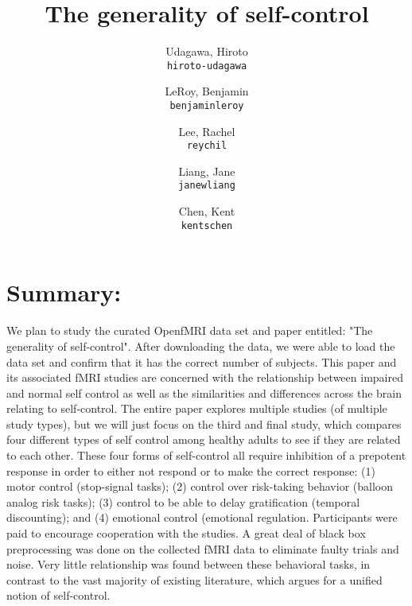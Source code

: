 \documentclass[11pt]{article}
\title{The generality of self-control}
\author{
  Udagawa, Hiroto\\
  \texttt{hiroto-udagawa}
  \and
  LeRoy, Benjamin\\
  \texttt{benjaminleroy}
  \and
  Lee, Rachel\\
  \texttt{reychil}
  \and
  Liang, Jane\\
  \texttt{janewliang}
  \and
  Chen, Kent\\
  \texttt{kentschen}
}
\begin{document}
\maketitle

\section{Summary:}
We plan to study the curated OpenfMRI data set and paper entitled: "The generality of self-control". After downloading the data, we were able to load the data set and confirm that it has the correct number of subjects. This paper and its associated fMRI studies are concerned with the relationship between impaired and normal self control as well as the similarities and differences across the brain relating to self-control. The entire paper explores multiple studies (of multiple study types), but we will just focus on the third and final study, which compares four different types of self control among healthy adults to see if they are related to each other. These four forms of self-control all require inhibition of a prepotent response in order to either not respond or to make the correct response: (1) motor control (stop-signal tasks); (2) control over risk-taking behavior (balloon analog risk tasks); (3) control to be able to delay gratification (temporal discounting); and (4) emotional control (emotional regulation. Participants were paid to encourage cooperation with the studies. A great deal of black box preprocessing was done on the collected fMRI data to eliminate faulty trials and noise. Very little relationship was found between these behavioral tasks, in contrast to the vast majority of existing literature, which argues for a unified notion of self-control.
\end{document}
